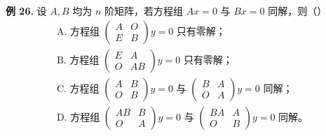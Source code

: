 \begin{problemblock}
\textbf{例 26.} 设 \(A,B\) 均为 \(n\) 阶矩阵，若方程组 \(Ax=0\) 与 \(Bx=0\) 同解，则（\quad）
\[
\begin{array}{l}
\text{A. 方程组 }\begin{pmatrix}A&O\\E&B\end{pmatrix}y=0\text{ 只有零解；}\\[4pt]
\text{B. 方程组 }\begin{pmatrix}E&A\\O&AB\end{pmatrix}y=0\text{ 只有零解；}\\[4pt]
\text{C. 方程组 }\begin{pmatrix}A&B\\O&B\end{pmatrix}y=0\text{ 与 }\begin{pmatrix}B&A\\O&A\end{pmatrix}y=0\text{ 同解；}\\[4pt]
\text{D. 方程组 }\begin{pmatrix}AB&B\\O&A\end{pmatrix}y=0\text{ 与 }\begin{pmatrix}BA&A\\O&B\end{pmatrix}y=0\text{ 同解。}
\end{array}
\]
\end{problemblock}
\begin{solutionblock}
\end{solutionblock}

